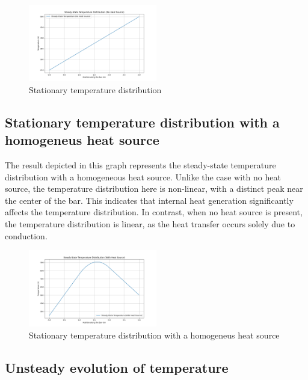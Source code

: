 \documentclass{article}
\begin{document}
\begin{figure}[h!]
  \centering
  \includegraphics[width=0.5\textwidth]{Figure_1.png}
  \caption{Stationary temperature distribution}
  \label{fig: Stationary temperature distribution}
\end{figure}

\subsection{Stationary temperature distribution with a homogeneus heat source}

The result depicted in this graph represents the steady-state temperature distribution with a homogeneous heat source. Unlike the case with no
heat source, the temperature distribution here is non-linear, with a distinct peak near the center of the bar. This indicates that internal heat
generation significantly affects the temperature distribution. In contrast, when no heat source is present, the temperature distribution is linear,
as the heat transfer occurs solely due to conduction.

\begin{figure}[H]
  \centering
  \includegraphics[width=0.5\textwidth]{Figure_2.png}
  \caption{Stationary temperature distribution with a homogeneus heat source}
  \label{fig: Stationary temperature distribution with a homogeneus heat source}
\end{figure}

\subsection{Unsteady evolution of temperature}
\end{document}
